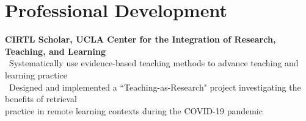 \section*{Professional Development}
\textbf{CIRTL Scholar, UCLA Center for the Integration of Research, Teaching, and Learning}\\
\textendash\ Systematically use evidence-based teaching methods to advance teaching and learning practice\\
\textendash\ Designed and implemented a ``Teaching-as-Research" project investigating the benefits of retrieval \\practice in remote learning contexts during the COVID-19 pandemic